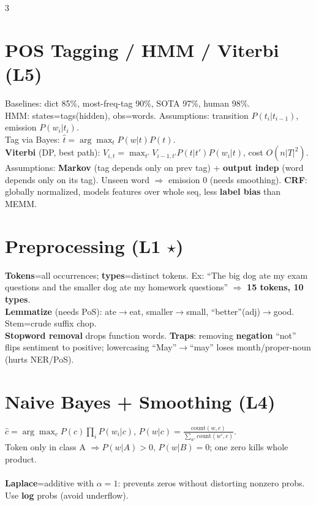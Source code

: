 \documentclass[12pt]{extarticle} %
\newcommand{\sub}[1]{\textcolor{key}{\textbf{#1}}}
\newcommand{\fbw}[1]{\colorbox{yellow!30}{\resizebox{0.96\columnwidth}{!}{$#1$}}} %
\begin{document}
\begin{multicols}{3}
\section{POS Tagging / HMM / Viterbi \textnormal{(L5)}}
Baselines: dict 85\%, most-freq-tag 90\%, SOTA 97\%, human 98\%.\\
HMM: states=tags(hidden), obs=words. Assumptions: transition $P(t_i|t_{i-1})$, emission $P(w_i|t_i)$.\\
Tag via Bayes: $\hat t=\arg\max_t P(w|t)P(t)$.\\
\sub{Viterbi} (DP, best path): $V_{i,t}=\max_{t'}V_{i-1,t'}P(t|t')P(w_i|t)$, cost $O(n|T|^2)$.\\
Assumptions: \sub{Markov} (tag depends only on prev tag) + \sub{output indep} (word depends only on its tag). Unseen word $\Rightarrow$ emission 0 (needs smoothing). \sub{CRF}: globally normalized, models features over whole seq, less \sub{label bias} than MEMM.

\section{Preprocessing \textnormal{(L1 \(\star\))}}
\sub{Tokens}=all occurrences; \sub{types}=distinct tokens. Ex: ``The big dog ate my exam questions and the smaller dog ate my homework questions'' $\Rightarrow$ \sub{15 tokens, 10 types}.\\
\sub{Lemmatize} (needs PoS): ate$\to$eat, smaller$\to$small, ``better''(adj)$\to$good. Stem=crude suffix chop.\\
\sub{Stopword removal} drops function words. \sub{Traps}: removing \sub{negation} ``not'' flips sentiment to positive; lowercasing ``May''$\to$``may'' loses month/proper-noun (hurts NER/PoS).

\section{Naive Bayes + Smoothing \textnormal{(L4)}}
$\hat c=\arg\max_c P(c)\prod_i P(w_i|c)$, $P(w|c)=\tfrac{\text{count}(w,c)}{\sum_{w'}\text{count}(w',c)}$.\\
Token only in class A $\Rightarrow P(w|A){>}0$, $P(w|B){=}0$; one zero kills whole product.\\
\fbw{P(w|c)=\frac{\text{count}(w,c)+\alpha}{\sum_{w'}\text{count}(w',c)+\alpha|V|}}\\
\sub{Laplace}=additive with $\alpha{=}1$: prevents zeros without distorting nonzero probs. Use \sub{log} probs (avoid underflow).


\end{multicols}
\end{document}
